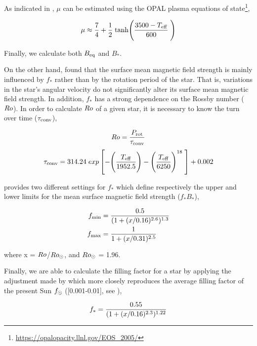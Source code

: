 \documentclass[fleqn,usenatbib]{mnras}
\begin{document}
As indicated in \citet{Cranmer2011}, $\mu$ can be estimated using the OPAL plasma equations of state\footnote{\url{https://opalopacity.llnl.gov/EOS_2005/}},
\begin{ceqn}
\begin{equation}
    \mu \approx \frac{7}{4} + \frac{1}{2} \; {\rm tanh}\Bigg(\frac{3500-T_{\mathrm{eff}}}{600}\;\Bigg) \label{eq:mf_atom_weight}
\end{equation}
\end{ceqn}
Finally, we calculate both $B_{\mathrm{eq}}$ and $B_*$.\par

On the other hand, \citet{Cranmer2011} found that the surface mean magnetic field strength is mainly influenced by $f_*$ rather than by the rotation period of the star. That is, variations in the star's angular velocity do not significantly alter its surface mean magnetic field strength. In addition, $f_*$ has a strong dependence on the Rossby number ($Ro$). In order to calculate $Ro$ of a given star, it is necessary to know the turn over time ($\tau_{\mathrm{conv}}$),
\begin{ceqn}
\begin{equation}
    Ro = \frac{P_{\mathrm{rot}}}{\tau_{\mathrm{conv}}} \label{eq:mf_rossby}
\end{equation}
\begin{equation}
    \tau_{\mathrm{conv}} = 314.24\;exp\left[-\Bigg(\frac{T_{\mathrm{eff}}}{1952.5}\Bigg)-\Bigg(\frac{T_{\mathrm{eff}}}{6250}\Bigg)^{18} \;\right]+0.002 \label{eq:mf_turnover}
\end{equation}
\end{ceqn}
\citet{Cranmer2011} provides two different settings for $f_*$ which define respectively the upper and lower limits for the mean surface magnetic field strength ($f_*B_*$),

\begin{ceqn}
\begin{align}
     f_{\mathrm{min}} &= \frac{0.5}{(1+(x/0.16)^{2.6})^{1.3}} \label{eq:fmin}\\
     f_{\mathrm{max}} &= \frac{1}{1+(x/0.31)^{2.5}} \label{eq:fmax}
\end{align}
\end{ceqn}
where x = $Ro$/$Ro_\odot$, and $Ro_\odot$ = 1.96.


Finally, we are able to calculate the filling factor for a star by applying the adjustment made by \citet{Gallet2013} which more closely reproduces the average filling factor of the present Sun $f_{\mathrm{\odot}}$ ([0.001-0.01], see \citep{Cranmer2011}),
\begin{ceqn}
\begin{equation}
     f_{\mathrm{*}} = \frac{0.55}{(1+(x/0.16)^{2.3})^{1.22}} \label{eq:fstart}
\end{equation}
\end{ceqn}
\end{document}
